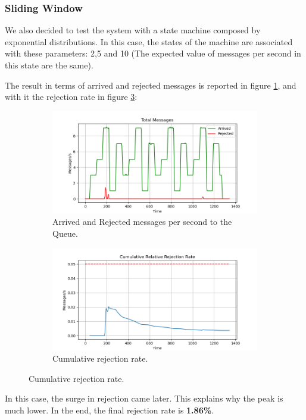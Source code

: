 \subsubsection{Sliding Window}
We also decided to test the system with a state machine composed by exponential distributions. In this case, the states of the machine are associated with these parameters: 2,5 and 10 (The expected value of messages per second in this state are the same). 

The result in terms of arrived and rejected messages is reported in figure \ref{fig:exponential_fast_messages}, and with it the rejection rate in figure \ref{fig:exponential_fast_rejection}:

\begin{figure}[H]
    \centering
    \begin{subfigure}{0.85\linewidth}
        \includegraphics[width=\linewidth]{images/sliding_window/constant/messages.png}
        \caption{Arrived and Rejected messages per second to the Queue.}
        \label{fig:exponential_fast_messages}
    \end{subfigure}
    \begin{subfigure}{0.85\linewidth}
        \includegraphics[width=\linewidth]{images/sliding_window/constant/rejection_cumulative.png}
        \caption{Cumulative rejection rate.}
        \label{fig:exponential_fast_rejection}
    \end{subfigure}
\end{figure}
In this case, the surge in rejection came later. This explains why the peak is much lower. In the end, the final rejection rate is \textbf{1.86\%}.

